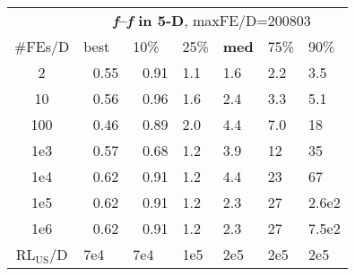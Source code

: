 \begin{tabular}{c|llllll}
 & \multicolumn{6}{|c}{\textbf{\textit{f}\raisebox{-0.35ex}{1}--\textit{f}\raisebox{-0.35ex}{24} in 5-D}, maxFE/D=200803}\\
\#FEs/D & best & 10\% & 25\% & \textbf{med} & 75\% & 90\%\\
2 & ~\,0.55 & ~\,0.91 & \hspace*{1ex}1.1 & \hspace*{1ex}1.6 & \hspace*{1ex}2.2 & \hspace*{1ex}3.5\\
10 & ~\,0.56 & ~\,0.96 & \hspace*{1ex}1.6 & \hspace*{1ex}2.4 & \hspace*{1ex}3.3 & \hspace*{1ex}5.1\\
100 & ~\,0.46 & ~\,0.89 & \hspace*{1ex}2.0 & \hspace*{1ex}4.4 & \hspace*{1ex}7.0 & 18\\
1e3 & ~\,0.57 & ~\,0.68 & \hspace*{1ex}1.2 & \hspace*{1ex}3.9 & 12 & 35\\
1e4 & ~\,0.62 & ~\,0.91 & \hspace*{1ex}1.2 & \hspace*{1ex}4.4 & 23 & 67\\
1e5 & ~\,0.62 & ~\,0.91 & \hspace*{1ex}1.2 & \hspace*{1ex}2.3 & 27 & 2.6e2\\
1e6 & ~\,0.62 & ~\,0.91 & \hspace*{1ex}1.2 & \hspace*{1ex}2.3 & 27 & 7.5e2\\
$\text{RL}_{\text{US}}$/D & 7e4 & 7e4 & 1e5 & 2e5 & 2e5 & 2e5
\end{tabular}
